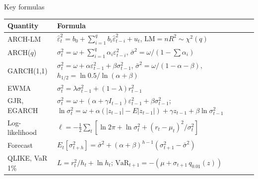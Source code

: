 \begin{frame}{Key formulas}
\itemsize{\small}
{\renewcommand{\arraystretch}{1.4}\begin{center}
\scriptsize
\begin{tabular}{ll}
\toprule
\textbf{Quantity} & \textbf{Formula} \\
\midrule
ARCH-LM & $\hat\varepsilon_t^2 = b_0 + \sum_{i=1}^{q}b_i\hat\varepsilon_{t-i}^2 + u_t$, \quad $\mathrm{LM} = nR^2 \sim \chi^2(q)$ \\
ARCH($q$) & $\sigma_t^2 = \omega + \sum_{i=1}^{q}\alpha_i\varepsilon_{t-i}^2$, \quad $\bar\sigma^2 = \omega/(1 - \sum\alpha_i)$ \\
GARCH(1,1) & $\sigma_t^2 = \omega + \alpha\varepsilon_{t-1}^2 + \beta\sigma_{t-1}^2$, \quad $\bar\sigma^2 = \omega/(1 - \alpha - \beta)$, \quad $h_{1/2} = \ln 0.5/\ln(\alpha + \beta)$ \\
EWMA & $\sigma_t^2 = \lambda\sigma_{t-1}^2 + (1 - \lambda)r_{t-1}^2$ \\
GJR, EGARCH & $\sigma_t^2 = \omega + (\alpha + \gamma I_{t-1})\varepsilon_{t-1}^2 + \beta\sigma_{t-1}^2$; \quad $\ln\sigma_t^2 = \omega + \alpha(|z_{t-1}| - E|z_{t-1}|) + \gamma z_{t-1} + \beta\ln\sigma_{t-1}^2$ \\
Log-likelihood & $\ell = -\frac12\sum_t[\ln 2\pi + \ln\sigma_t^2 + (r_t - \mu_t)^2/\sigma_t^2]$ \\
Forecast & $E_t[\sigma_{t+h}^2] = \bar\sigma^2 + (\alpha + \beta)^{h-1}(\sigma_{t+1}^2 - \bar\sigma^2)$ \\
QLIKE, VaR 1\% & $L = r_t^2/h_t + \ln h_t$; \quad $\mathrm{VaR}_{t+1} = -(\mu + \sigma_{t+1}\,q_{0.01}(z))$ \\
\bottomrule
\end{tabular}
\end{center}
}
\end{frame}


